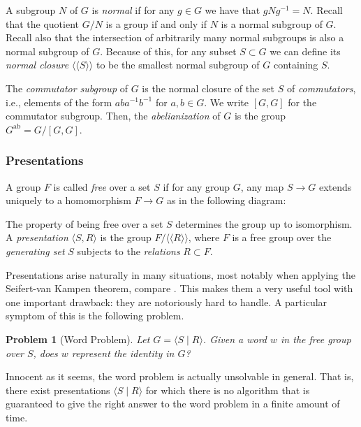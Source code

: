 \documentclass[a4paper]{article}
\newtheorem{problem}[theorem]{Problem}
\theoremstyle{definition}
\begin{document}
A subgroup $N$ of $G$ is \textit{normal} if for any $g \in G$ we have that $gNg^{-1} = N$. Recall that the quotient $G/N$ is a group if and only if $N$ is a normal subgroup of $G$. Recall also that the intersection of arbitrarily many normal subgroups is also a normal subgroup of $G$. Because of this, for any subset $S \subset G$ we can define its \textit{normal closure} $\langle \langle S \rangle \rangle$ to be the smallest normal subgroup of $G$ containing $S$.

The \textit{commutator subgroup} of $G$ is the normal closure of the set $S$ of \textit{commutators}, i.e., elements of the form $aba^{-1}b^{-1}$ for $a, b \in G$. We write $[G, G]$ for the commutator subgroup. Then, the \textit{abelianization} of $G$ is the group $G^{\text{ab}} = G / [G, G]$.

\subsubsection{Presentations}
A group $F$ is called \textit{free} over a set $S$ if for any group $G$, any map $S \rightarrow G$ extends uniquely to a homomorphism $F \rightarrow G$ as in the following diagram:

\begin{figure}[ht]
\centering
{}
\end{figure}

The property of being free over a set $S$ determines the group up to isomorphism.
A \textit{presentation} $\langle S, R \rangle$ is the group $F/\langle \langle R \rangle \rangle$, where $F$ is a free group over the \textit{generating set} $S$ subjects to the \textit{relations} $R \subset F$.

Presentations arise naturally in many situations, most notably when applying the Seifert-van Kampen theorem, compare \cite{hatcher2002}. This makes them a very useful tool with one important drawback: they are notoriously hard to handle. A particular symptom of this is the following problem.

\begin{problem}[Word Problem]
Let $G = \langle S \; | \; R \rangle$.
Given a word $w$ in the free group over $S$, does $w$ represent the identity in $G$?
\end{problem}

Innocent as it seems, the word problem is actually unsolvable in general. That is, there exist presentations $\langle S \; | \; R \rangle$ for which there is no algorithm that is guaranteed to give the right answer to the word problem in a finite amount of time.
\end{document}
